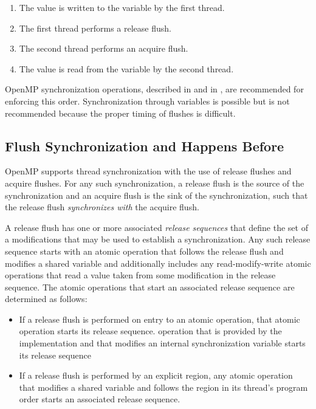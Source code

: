 \begin{enumerate}
    \item The value is written to the variable by the first thread.
    \item The first thread performs a release flush.
    \item The second thread performs an acquire flush.
    \item The value is read from the variable by the second thread.
\end{enumerate}

\begin{note}
OpenMP synchronization operations, described in 
 and in , 
are recommended for enforcing this order. Synchronization 
through variables is possible but is not recommended because the proper timing
of flushes is difficult.
\end{note}


\subsection{Flush Synchronization and Happens Before}
\label{subsec:happens-before}

OpenMP supports thread synchronization with the use of release flushes and
acquire flushes. For any such synchronization, a release flush is the source
of the synchronization and an acquire flush is the sink of the
synchronization, such that the release flush \emph{synchronizes with} the
acquire flush.

A release flush has one or more associated \emph{release sequences} that
define the set of a modifications that may be used to establish a
synchronization. Any such release sequence starts with an atomic operation
that follows the release flush and modifies a shared variable and additionally
includes any read-modify-write atomic operations that read a value taken from
some modification in the release sequence. The atomic operations that start an
associated release sequence are determined as follows:

\begin{itemize}
\item If a release flush is performed on entry to an atomic operation, that
    atomic operation starts its release sequence.
    operation that is provided by the implementation and that modifies an internal
    synchronization variable starts its release sequence
\item If a release flush is performed by an explicit  region, any
    atomic operation that modifies a shared variable and follows the
     region in its thread's program order starts an associated
    release sequence.
\end{itemize}

